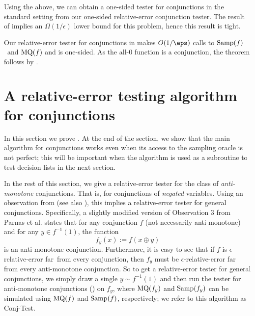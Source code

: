 \documentclass[11pt]{article}
\theoremstyle{definition}
\begin{document}
Using the above, we can obtain a one-sided tester for conjunctions in the standard setting from our one-sided relative-error conjunction tester. The result of \cite{BshoutyGoldreich022} implies an $\Omega(1/\epsilon)$ lower bound for this problem, hence this result is tight. 

\begin{proofof}{}
    Our relative-error tester for conjunctions in  makes $O(1/\eps)$ calls to $\mathrm{Samp}(f)$~and $\mathrm{MQ}(f)$  and is one-sided. As the all-$0$ function is a conjunction, the theorem follows by . 
\end{proofof}



















 

\section{A relative-error testing algorithm for conjunctions} \label{sec:conjunction}

In this section we prove . {At the end of the section, we show that the main  algorithm for conjunctions works even when 
  its access to the sampling oracle is not perfect; this will be important when the algorithm is used as a subroutine to test decision lists in the next section.}


\begin{remark} \label{remark:monotone}
In the rest of this section, we give a relative-error tester for the class of \emph{anti-monotone} conjunctions. That is, for conjunctions of {\it negated} variables. Using an observation from \cite{PRS02} (see also \cite{GoldreichRon20}), this implies a relative-error tester for general conjunctions. 
Specifically, a slightly modified version of Observation 3 from Parnas et al.  \cite{PRS02} states that for any conjunction $f$ (not necessarily anti-monotone) and for any $y \in f^{-1}(1)$, the function
\[f_{y}(x) :=f(x \oplus y)\] 
is an anti-monotone conjunction. Furthermore, it is easy to see that if $f$  is $\epsilon$-relative-error far~from every conjunction, then $f_{{y}}$ must be $\epsilon$-relative-error far from every anti-monotone conjunction. So to get a relative-error tester for general conjunctions, we simply draw a single $y \sim f^{-1}(1)$ and then run the tester for anti-monotone conjunctions () on $f_{y}$, {where $\mathrm{MQ}(f_y)$ and $\mathrm{Samp}(f_y)$ can be simulated  using 
 $\mathrm{MQ}(f)$ and $\mathrm{Samp}(f)$, respectively}; we refer to this algorithm as \hypertarget{Algorithm2}{\sc Conj-Test}. \end{remark}
\end{document}
